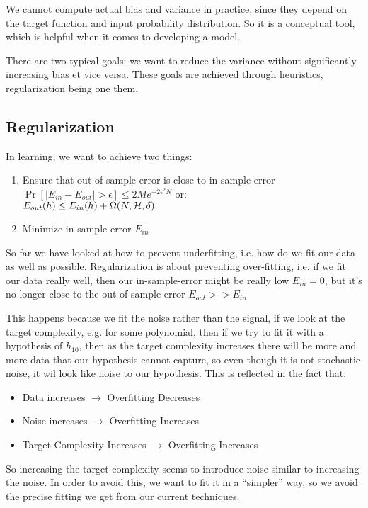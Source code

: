     We cannot compute actual bias and variance in practice, since they depend 
    on the target function and input probability distribution. So it is a 
    conceptual tool, which is helpful when it comes to developing a model.
    
    There are two typical goals: we want to reduce the variance without 
    significantly increasing bias et vice versa. These goals are achieved 
    through heuristics, regularization being one them.
    
    \subsection{Regularization}
    In learning, we want to achieve two things:
    \begin{enumerate}
        \item Ensure that out-of-sample error is close to in-sample-error \\
        $\Pr\left[|E_{in} - E_{out}| > \epsilon\right] \leq 
        2Me^{-2\epsilon^2N}$ or:\\
        $E_{out}(h)\leq E_{in}(h)+\Omega(N,\mathcal{H},\delta)$ 
        \item Minimize in-sample-error $E_{in}$
    \end{enumerate}
    So far we have looked at how to prevent underfitting, i.e. how do we fit 
    our data as well as possible. Regularization is about preventing 
    over-fitting, i.e. if we fit our data really well, then our in-sample-error 
    might be really low $E_{in}=0$, but it's no longer close to the 
    out-of-sample-error $E_{out}>>E_{in}$
    
    This happens because we fit the noise rather than the signal, if we look at 
    the target complexity, e.g. for some polynomial, then if we try to fit it 
    with a hypothesis of $h_{10}$, then as the target complexity increases 
    there will be more and more data that our hypothesis cannot capture, so 
    even though it is not stochastic noise, it wil look like noise to our 
    hypothesis. This is reflected in the fact that:
    \begin{itemize}
        \item Data increases $\rightarrow$ Overfitting Decreases
        \item Noise increases $\rightarrow$ Overfitting Increases
        \item Target Complexity Increases $\rightarrow$ Overfitting Increases
    \end{itemize}
    So increasing the target complexity seems to introduce noise similar to 
    increasing the noise. In order to avoid this, we want to fit it in a 
    ``simpler'' way, so we avoid the precise fitting we get from our current 
    techniques.
    
